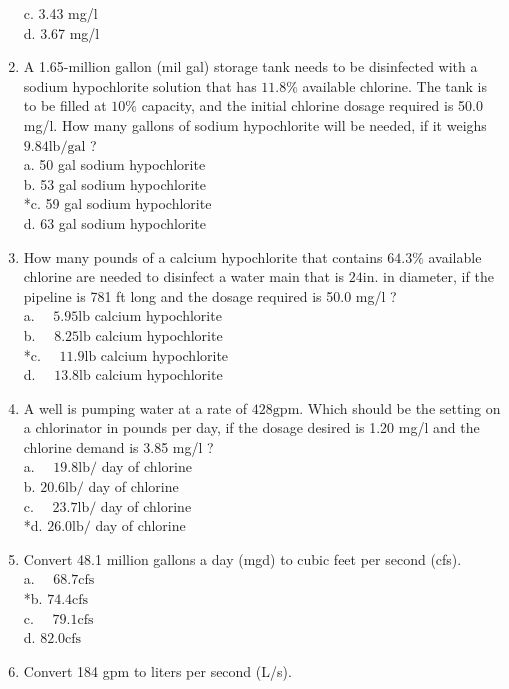 \begin{enumerate}
c. 3.43 mg/l\\
d. 3.67 mg/l\\
\item A 1.65-million gallon (mil gal) storage tank needs to be disinfected with a sodium hypochlorite solution that has $11.8 \%$ available chlorine. The tank is to be filled at $10 \%$ capacity, and the initial chlorine dosage required is 50.0 mg/l. How many gallons of sodium hypochlorite will be needed, if it weighs $9.84 \mathrm{lb} / \mathrm{gal}$ ?\\
a. 50 gal sodium hypochlorite\\
b. 53 gal sodium hypochlorite\\
*c. 59 gal sodium hypochlorite\\
d. 63 gal sodium hypochlorite\\
\item How many pounds of a calcium hypochlorite that contains $64.3 \%$ available chlorine are needed to disinfect a water main that is $24 \mathrm{in}$. in diameter, if the pipeline is 781 ft long and the dosage required is 50.0 mg/l ?\\
a. $\quad 5.95 \mathrm{lb}$ calcium hypochlorite\\
b. $\quad 8.25 \mathrm{lb}$ calcium hypochlorite\\
*c. $\quad 11.9 \mathrm{lb}$ calcium hypochlorite\\
d. $\quad 13.8 \mathrm{lb}$ calcium hypochlorite\\
\item A well is pumping water at a rate of $428 \mathrm{gpm}$. Which should be the setting on a chlorinator in pounds per day, if the dosage desired is 1.20 mg/l and the chlorine demand is 3.85 mg/l ?\\
a. $\quad 19.8 \mathrm{lb} /$ day of chlorine\\
b. $20.6 \mathrm{lb} /$ day of chlorine\\
c. $\quad 23.7 \mathrm{lb} /$ day of chlorine\\
*d. $26.0 \mathrm{lb} /$ day of chlorine\\
\item Convert 48.1 million gallons a day (mgd) to cubic feet per second (cfs).\\
a. $\quad 68.7 \mathrm{cfs}$\\
*b. $74.4 \mathrm{cfs}$\\
c. $\quad 79.1 \mathrm{cfs}$\\
d. $82.0 \mathrm{cfs}$\\
\item Convert 184 gpm to liters per second (L/s).\\

\end{enumerate}
